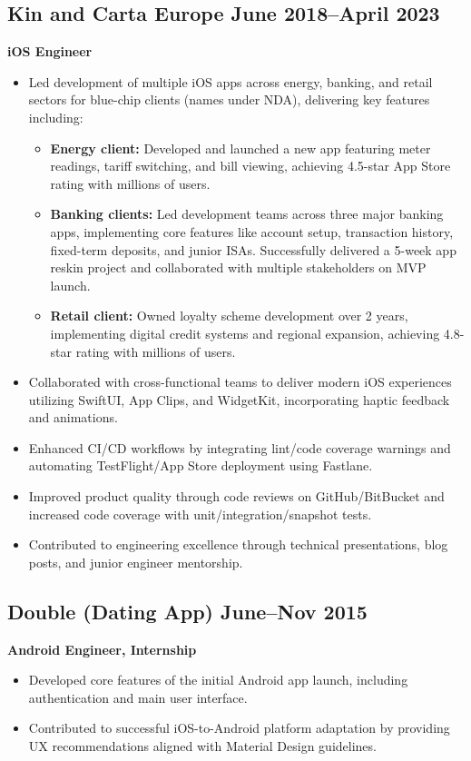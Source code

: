 \documentclass[11pt,a4paper]{article}
\begin{document}
\subsection*{Kin and Carta Europe \hfill June 2018--April 2023}
\textbf{iOS Engineer}
\begin{itemize}[leftmargin=*]
\item Led development of multiple iOS apps across energy, banking, and retail sectors for blue-chip clients (names under NDA), delivering key features including:
\begin{itemize}
\item \textbf{Energy client:} Developed and launched a new app featuring meter readings, tariff switching, and bill viewing, achieving 4.5-star App Store rating with millions of users.
\item \textbf{Banking clients:} Led development teams across three major banking apps, implementing core features like account setup, transaction history, fixed-term deposits, and junior ISAs. Successfully delivered a 5-week app reskin project and collaborated with multiple stakeholders on MVP launch.
\item \textbf{Retail client:} Owned loyalty scheme development over 2 years, implementing digital credit systems and regional expansion, achieving 4.8-star rating with millions of users.
\end{itemize}
\item Collaborated with cross-functional teams to deliver modern iOS experiences utilizing SwiftUI, App Clips, and WidgetKit, incorporating haptic feedback and animations.
\item Enhanced CI/CD workflows by integrating lint/code coverage warnings and automating TestFlight/App Store deployment using Fastlane.
\item Improved product quality through code reviews on GitHub/BitBucket and increased code coverage with unit/integration/snapshot tests.
\item Contributed to engineering excellence through technical presentations, blog posts, and junior engineer mentorship.
\end{itemize}

\subsection*{Double (Dating App) \hfill June--Nov 2015}
\textbf{Android Engineer, Internship}
\begin{itemize}[leftmargin=*]
\item Developed core features of the initial Android app launch, including authentication and main user interface.
\item Contributed to successful iOS-to-Android platform adaptation by providing UX recommendations aligned with Material Design guidelines.
\end{itemize}
\end{document}
